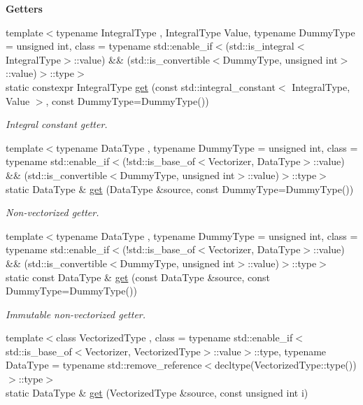 \begin{Indent}{\bf Getters}\par
\begin{DoxyCompactItemize}
\item 
{\footnotesize template$<$typename Integral\-Type , Integral\-Type Value, typename Dummy\-Type  = unsigned int, class  = typename std\-::enable\-\_\-if$<$(std\-::is\-\_\-integral$<$\-Integral\-Type$>$\-::value) \&\& (std\-::is\-\_\-convertible$<$\-Dummy\-Type, unsigned int$>$\-::value)$>$\-::type$>$ }\\static constexpr Integral\-Type \hyperlink{classmagrathea_1_1Vectorizer_a8d9b9d79268199cbac2906cffd22c0d4}{get} (const std\-::integral\-\_\-constant$<$ Integral\-Type, Value $>$, const Dummy\-Type=Dummy\-Type())
\begin{DoxyCompactList}\small\item\em Integral constant getter. \end{DoxyCompactList}\item 
{\footnotesize template$<$typename Data\-Type , typename Dummy\-Type  = unsigned int, class  = typename std\-::enable\-\_\-if$<$(!std\-::is\-\_\-base\-\_\-of$<$\-Vectorizer, Data\-Type$>$\-::value) \&\& (std\-::is\-\_\-convertible$<$\-Dummy\-Type, unsigned int$>$\-::value)$>$\-::type$>$ }\\static Data\-Type \& \hyperlink{classmagrathea_1_1Vectorizer_a7a89b7c95b5067316ad946aaab3d5686}{get} (Data\-Type \&source, const Dummy\-Type=Dummy\-Type())
\begin{DoxyCompactList}\small\item\em Non-\/vectorized getter. \end{DoxyCompactList}\item 
{\footnotesize template$<$typename Data\-Type , typename Dummy\-Type  = unsigned int, class  = typename std\-::enable\-\_\-if$<$(!std\-::is\-\_\-base\-\_\-of$<$\-Vectorizer, Data\-Type$>$\-::value) \&\& (std\-::is\-\_\-convertible$<$\-Dummy\-Type, unsigned int$>$\-::value)$>$\-::type$>$ }\\static const Data\-Type \& \hyperlink{classmagrathea_1_1Vectorizer_a9a63af59c59b04cbbe01a3447a7ac552}{get} (const Data\-Type \&source, const Dummy\-Type=Dummy\-Type())
\begin{DoxyCompactList}\small\item\em Immutable non-\/vectorized getter. \end{DoxyCompactList}\item 
{\footnotesize template$<$class Vectorized\-Type , class  = typename std\-::enable\-\_\-if$<$std\-::is\-\_\-base\-\_\-of$<$\-Vectorizer, Vectorized\-Type$>$\-::value$>$\-::type, typename Data\-Type  = typename std\-::remove\-\_\-reference$<$decltype(\-Vectorized\-Type\-::type())$>$\-::type$>$ }\\static Data\-Type \& \hyperlink{classmagrathea_1_1Vectorizer_af077b83bc7bc9d07e59895cf3df6641e}{get} (Vectorized\-Type \&source, const unsigned int i)

\end{DoxyCompactItemize}
\end{Indent}
